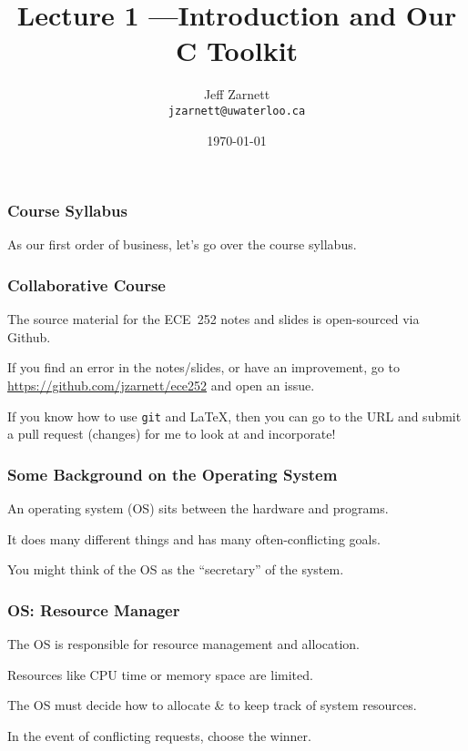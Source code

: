 

\title{Lecture 1 ---Introduction and Our C Toolkit }

\author{Jeff Zarnett \\ \small \texttt{jzarnett@uwaterloo.ca}}
\date{\today}




\begin{frame}
	\titlepage

\end{frame}

\begin{frame}
	\frametitle{Course Syllabus}

	As our first order of business, let's go over the course syllabus.

\end{frame}

\begin{frame}
	\frametitle{Collaborative Course}

	The source material for the ECE~252 notes and slides is open-sourced via Github.

	If you find an error in the notes/slides, or have an improvement, go to \url{https://github.com/jzarnett/ece252} and open an issue.

	If you know how to use \texttt{git} and \LaTeX, then you can go to the URL and submit a pull request (changes) for me to look at and incorporate!


\end{frame}

\begin{frame}
	\frametitle{Some Background on the Operating System}

	An operating system (OS) sits between the hardware and programs.

	It does many different things and has many often-conflicting goals.

	You might think of the OS as the ``secretary'' of the system.

\end{frame}

\begin{frame}
	\frametitle{OS: Resource Manager}

	The OS is responsible for resource management and allocation.

	Resources like CPU time or memory space are limited.

	The OS must decide how to allocate \& to keep track of system resources.

	In the event of conflicting requests, choose the winner.


\end{frame}

